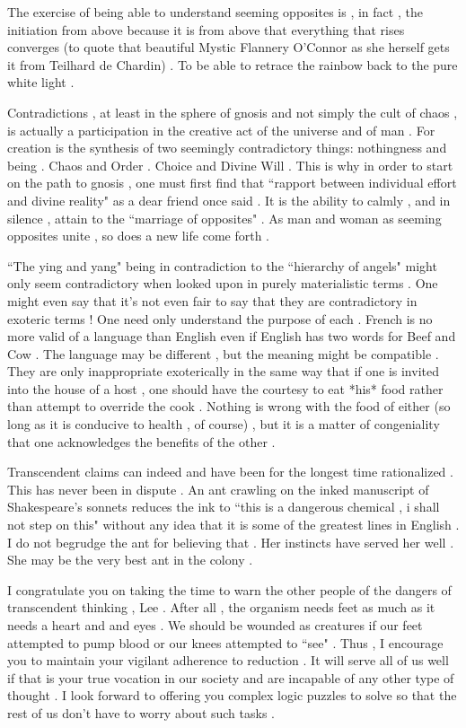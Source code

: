 \begin{footnotesize}
\begin{sffamily}
The exercise of being able to understand seeming opposites is , in fact , the initiation from above because it is from above that everything that rises converges (to quote that beautiful Mystic Flannery O'Connor as she herself gets it from Teilhard de Chardin) . To be able to retrace the rainbow back to the pure white light .

Contradictions , at least in the sphere of gnosis and not simply the cult of chaos , is actually a participation in the creative act of the universe and of man . For creation is the synthesis of two seemingly contradictory things: nothingness and being . Chaos and Order . Choice and Divine Will . This is why in order to start on the path to gnosis , one must first find that ``rapport between individual effort and divine reality" as a dear friend once said . It is the ability to calmly , and in silence , attain to the ``marriage of opposites" . As man and woman as seeming opposites unite , so does a new life come forth .

``The ying and yang" being in contradiction to the ``hierarchy of angels" might only seem contradictory when looked upon in purely materialistic terms . One might even say that it's not even fair to say that they are contradictory in exoteric terms ! One need only understand the purpose of each . French is no more valid of a language than English even if English has two words for Beef and Cow . The language may be different , but the meaning might be compatible . They are only inappropriate exoterically in the same way that if one is invited into the house of a host , one should have the courtesy to eat *his* food rather than attempt to override the cook . Nothing is wrong with the food of either (so long as it is conducive to health , of course) , but it is a matter of congeniality that one acknowledges the benefits of the other . 

Transcendent claims can indeed and have been for the longest time rationalized . This has never been in dispute . An ant crawling on the inked manuscript of Shakespeare's sonnets reduces the ink to ``this is a dangerous chemical , i shall not step on this" without any idea that it is some of the greatest lines in English . I do not begrudge the ant for believing that . Her instincts have served her well . She may be the very best ant in the colony .

I congratulate you on taking the time to warn the other people of the dangers of transcendent thinking , Lee . After all , the organism needs feet as much as it needs a heart and and eyes . We should be wounded as creatures if our feet attempted to pump blood or our knees attempted to ``see" . Thus , I encourage you to maintain your vigilant adherence to reduction . It will serve all of us well if that is your true vocation in our society and are incapable of any other type of thought . I look forward to offering you complex logic puzzles to solve so that the rest of us don't have to worry about such tasks .


\end{sffamily}
\end{footnotesize}
